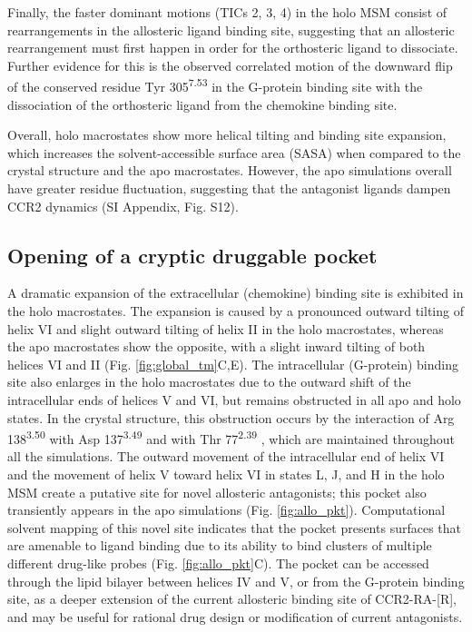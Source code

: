 \documentclass[9pt,twocolumn,twoside]{pnas-new}
\begin{document}
Finally, the faster dominant motions (TICs 2, 3, 4) in the holo MSM consist of rearrangements in the allosteric ligand binding site, suggesting that an allosteric rearrangement must first happen in order for the orthosteric ligand to dissociate.
Further evidence for this is the observed correlated motion of the downward flip of the conserved residue Tyr 305\textsuperscript{7.53} in the G-protein binding site with the dissociation of the orthosteric ligand from the chemokine binding site.

Overall, holo macrostates show more helical tilting and binding site expansion, which increases the solvent-accessible surface area (SASA) when compared to the crystal structure and the apo macrostates.
However, the apo simulations overall have greater residue fluctuation, suggesting that the antagonist ligands dampen CCR2 dynamics (SI Appendix, Fig. S12).

\subsection*{\textbf{Opening of a cryptic druggable pocket}}

A dramatic expansion of the extracellular (chemokine) binding site is exhibited in the holo macrostates.
The expansion is caused by a pronounced outward tilting of helix VI and slight outward tilting of helix II in the holo macrostates, whereas the apo macrostates show the opposite, with a slight inward tilting of both helices VI and II (Fig. \ref{fig:global_tm}C,E).
The intracellular (G-protein) binding site also enlarges in the holo macrostates due to the outward shift of the intracellular ends of helices V and VI, but remains obstructed in all apo and holo states.
In the crystal structure, this obstruction occurs by the interaction of Arg 138\textsuperscript{3.50} with Asp 137\textsuperscript{3.49} and with Thr 77\textsuperscript{2.39} \cite{Zheng2016}, which are maintained throughout all the simulations.
The outward movement of the intracellular end of helix VI and the movement of helix V toward helix VI in states L, J, and H in the holo MSM create a putative site for novel allosteric antagonists; this pocket also transiently appears in the apo simulations (Fig. \ref{fig:allo_pkt}).
Computational solvent mapping\cite{Kozakov2015} of this novel site indicates that the pocket presents surfaces that are amenable to ligand binding due to its ability to bind clusters of multiple different drug-like probes (Fig. \ref{fig:allo_pkt}C).
The pocket can be accessed through the lipid bilayer between helices IV and V, or from the G-protein binding site, as a deeper extension of the current allosteric binding site of CCR2-RA-[R], and may be useful for rational drug design or modification of current antagonists.
\end{document}
